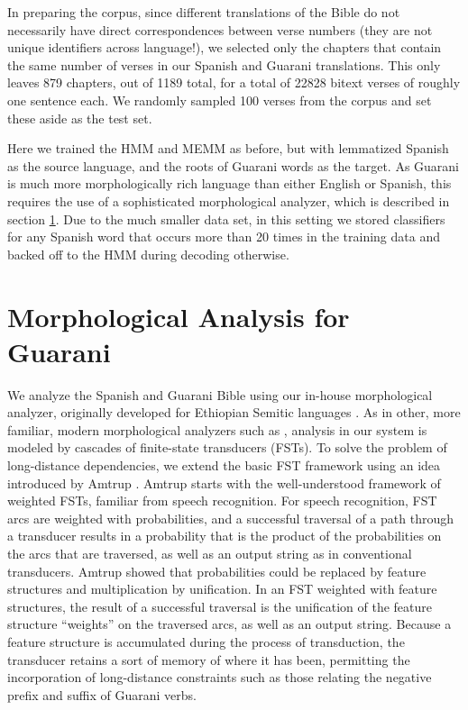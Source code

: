 \documentclass[11pt]{article}
\begin{document}
In preparing the corpus, since different translations of the Bible do not
necessarily have direct correspondences between verse numbers (they are not
unique identifiers across language!), we selected only the chapters that contain
the same number of verses in our Spanish and Guarani translations.  This only
leaves 879 chapters, out of 1189 total, for a total of 22828 bitext verses of
roughly one sentence each. We randomly sampled 100 verses from the corpus and
set these aside as the test set.

Here we trained the HMM and MEMM as before, but with lemmatized Spanish as the
source language, and the roots of Guarani words as the target.  As Guarani is
much more morphologically rich language than either English or Spanish, this
requires the use of a sophisticated morphological analyzer, which is described
in section \ref{sec:guaranima}. Due to the much smaller data set, in this
setting we stored classifiers for any Spanish word that occurs more than 20
times in the training data and backed off to the HMM during decoding otherwise.

\section{Morphological Analysis for Guarani}
\label{sec:guaranima}
We analyze the Spanish and Guarani Bible using our in-house morphological
analyzer, originally developed for Ethiopian Semitic languages 
\cite{gasser:eacl09}.
As in other, more familiar, modern
morphological analyzers such as \cite{beesley+karttunen}, analysis in our
system is modeled by cascades of finite-state transducers (FSTs).  To solve the
problem of long-distance dependencies, we extend the basic FST framework using
an idea introduced by Amtrup .  Amtrup starts with the
well-understood framework of weighted FSTs, familiar from speech recognition.
For speech recognition, FST arcs are weighted with probabilities, and a
successful traversal of a path through a transducer results in a probability
that is the product of the probabilities on the arcs that are traversed, as
well as an output string as in conventional transducers.  Amtrup showed that
probabilities could be replaced by feature structures and multiplication by
unification.  In an FST weighted with feature structures, the result of a
successful traversal is the unification of the feature structure ``weights'' on
the traversed arcs, as well as an output string.  Because a feature structure
is accumulated during the process of transduction, the transducer retains a
sort of memory of where it has been, permitting the incorporation of
long-distance constraints such as those relating the negative prefix and suffix
of Guarani verbs.
\end{document}
